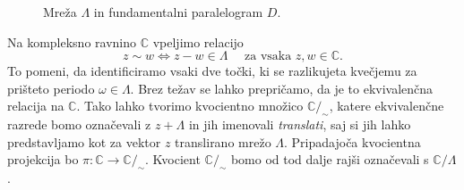 \documentclass[mat1]{fmfdelo}
\numberwithin{equation}{section}
\newcommand{\C}{\mathbb C}
\theoremstyle{definition}
\begin{document}
\begin{figure}[H]
    \centering

    \caption{Mreža $\Lambda$ in fundamentalni paralelogram $D$.}
    \label{mreza}
\end{figure}

Na kompleksno ravnino $\C$ vpeljimo relacijo 
\[
    z \sim w \iff z - w \in \Lambda \quad \text{ za vsaka $z,w \in \C$.}
\]
To pomeni, da identificiramo vsaki dve točki, ki se razlikujeta kvečjemu za prišteto periodo $\omega \in \Lambda$. 
Brez težav se lahko prepričamo, da je to ekvivalenčna relacija na $\C$. Tako lahko tvorimo kvocientno množico $\C/_{\sim}$, katere ekvivalenčne razrede bomo označevali z $z + \Lambda$ in jih imenovali \emph{translati}, saj si jih lahko predstavljamo kot za vektor $z$ translirano mrežo $\Lambda$. Pripadajoča kvocientna projekcija bo $\pi : \C \to \C/_{\sim}$. Kvocient $\C/_{\sim}$ bomo od tod dalje rajši označevali s $\C/\Lambda$. 
\end{document}
